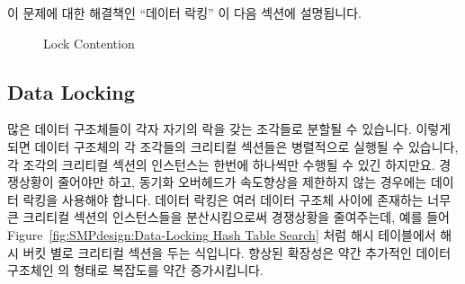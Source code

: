 이 문제에 대한 해결책인 ``데이터 락킹'' 이 다음 섹션에 설명됩니다.

\begin{figure}[tbh]
\centering
{}
\caption{Lock Contention}
\end{figure}

\subsection{Data Locking}
\label{sec:SMPdesign:Data Locking}

많은 데이터 구조체들이 각자 자기의 락을 갖는 조각들로 분할될 수 있습니다.
이렇게 되면 데이터 구조체의 각 조각들의 크리티컬 섹션들은 병렬적으로 실행될 수
있습니다, 각 조각의 크리티컬 섹션의 인스턴스는 한번에 하나씩만 수행될 수 있긴
하지만요.
경쟁상황이 줄어야만 하고, 동기화 오버헤드가 속도향상을 제한하지 않는 경우에는
데이터 락킹을 사용해야 합니다.
데이터 락킹은 여러 데이터 구조체 사이에 존재하는 너무 큰 크리티컬 섹션의
인스턴스들을 분산시킴으로써 경쟁상황을 줄여주는데, 예를 들어
Figure~\ref{fig:SMPdesign:Data-Locking Hash Table Search} 처럼 해시 테이블에서
해시 버킷 별로 크리티컬 섹션을 두는 식입니다.
향상된 확장성은 약간 추가적인 데이터 구조체인  의 형태로
복잡도를 약간 증가시킵니다.
\iffalse

